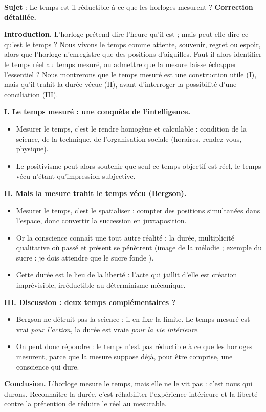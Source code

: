 \documentclass[11pt]{article}
\begin{document}
\begin{exoresolu}
\textbf{Sujet} : Le temps est-il réductible à ce que les horloges mesurent ?
\tcblower
\textbf{Correction détaillée.}

\textbf{Introduction.} L'horloge prétend dire l'heure qu'il est ; mais peut-elle dire ce qu'est le temps ? Nous vivons le temps comme attente, souvenir, regret ou espoir, alors que l'horloge n'enregistre que des positions d'aiguilles. Faut-il alors identifier le temps réel au temps mesuré, ou admettre que la mesure laisse échapper l'essentiel ? Nous montrerons que le temps mesuré est une construction utile (I), mais qu'il trahit la durée vécue (II), avant d'interroger la possibilité d'une conciliation (III).

\textbf{I. Le temps mesuré : une conquête de l'intelligence.}
\begin{itemize}
\item Mesurer le temps, c'est le rendre homogène et calculable : condition de la science, de la technique, de l'organisation sociale (horaires, rendez-vous, physique).
\item Le positivisme peut alors soutenir que seul ce temps objectif est réel, le temps vécu n'étant qu'impression subjective.
\end{itemize}

\textbf{II. Mais la mesure trahit le temps vécu (Bergson).}
\begin{itemize}
\item Mesurer le temps, c'est le spatialiser : compter des positions simultanées dans l'espace, donc convertir la succession en juxtaposition.
\item Or la conscience connaît une tout autre réalité : la durée, multiplicité qualitative où passé et présent se pénètrent (image de la mélodie ; exemple du sucre : \guillemotleft je dois attendre que le sucre fonde \guillemotright).
\item Cette durée est le lieu de la liberté : l'acte qui jaillit d'elle est création imprévisible, irréductible au déterminisme mécanique.
\end{itemize}

\textbf{III. Discussion : deux temps complémentaires ?}
\begin{itemize}
\item Bergson ne détruit pas la science : il en fixe la limite. Le temps mesuré est vrai \emph{pour l'action}, la durée est vraie \emph{pour la vie intérieure}.
\item On peut donc répondre : le temps n'est pas réductible à ce que les horloges mesurent, parce que la mesure suppose déjà, pour être comprise, une conscience qui dure.
\end{itemize}

\textbf{Conclusion.} L'horloge mesure le temps, mais elle ne le vit pas : c'est nous qui durons. Reconnaître la durée, c'est réhabiliter l'expérience intérieure et la liberté contre la prétention de réduire le réel au mesurable.
\end{exoresolu}
\end{document}
